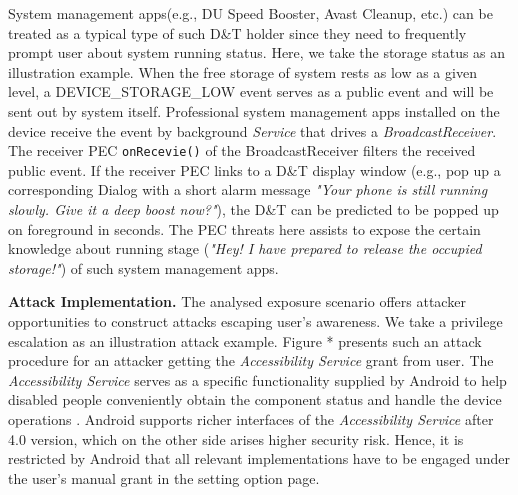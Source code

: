 System management apps(e.g., DU Speed Booster, Avast Cleanup, etc.) can be treated as a typical type of such D\&T holder since they need to frequently prompt user about system running status. Here, we take the storage status as an illustration example. When the free storage of system rests as low as a given level, a DEVICE\_STORAGE\_LOW event serves as a public event and will be sent out by system itself. Professional system management apps installed on the device receive the event by background \textit{Service} that drives a \textit{BroadcastReceiver}. The receiver PEC \texttt{onRecevie()} of the BroadcastReceiver filters the received public event. If the receiver PEC links to a D\&T display window (e.g., pop up a corresponding Dialog with a short alarm message \textit{"Your phone is still running slowly. Give it a deep boost now?"}), the D\&T can be predicted to be popped up on foreground in seconds. The PEC threats here assists to expose the certain knowledge about running stage (\textit{"Hey! I have prepared to release the occupied storage!"}) of such system management apps.




\textbf{Attack Implementation.}
The analysed exposure scenario offers attacker opportunities to construct attacks escaping user's awareness. We take a privilege escalation as an illustration attack example. Figure * presents such an attack procedure for an attacker getting the \textit{Accessibility Service} grant from user. The \textit{Accessibility Service} serves as a specific functionality supplied by Android to help disabled people conveniently obtain the component status and handle the device operations . Android supports richer interfaces of the \textit{Accessibility Service} after 4.0 version, which on the other side arises higher security risk. Hence, it is restricted by Android that all relevant implementations have to be engaged under the user's manual grant in the setting option page.

